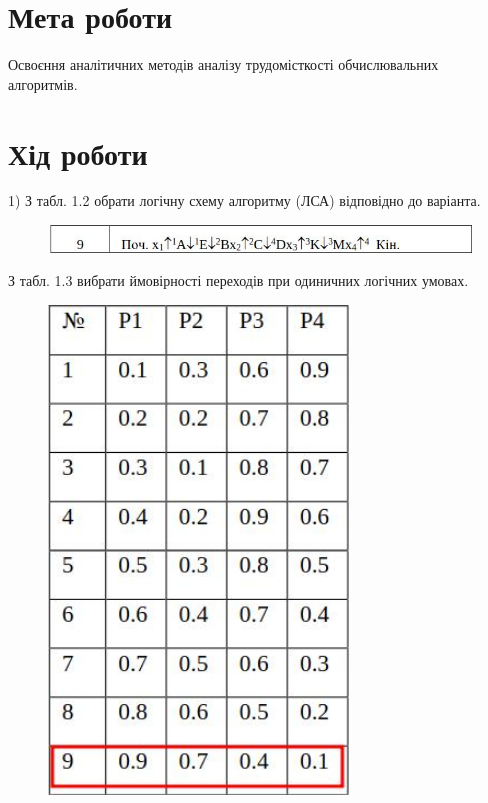 \section{Мета роботи}
Освоєння аналітичних методів аналізу трудомісткості
обчислювальних алгоритмів.

\section{Хід роботи}
1) З табл. 1.2 обрати логічну схему алгоритму (ЛСА) відповідно до
варіанта.
\begin{figure}[h]
    \centering
    \includegraphics[width=16cm]{reports/algos/lab1/assets/1.png}
\end{figure}

З табл. 1.3 вибрати ймовірності переходів при одиничних логічних
умовах.
\begin{figure}[h]
    \centering
    \includegraphics[width=8cm]{reports/algos/lab1/assets/2.png}
\end{figure}


